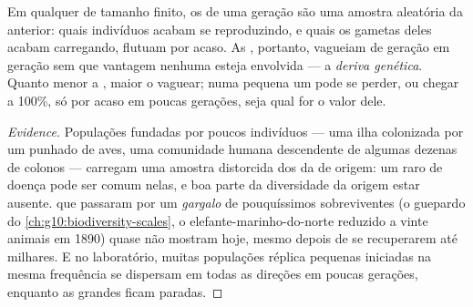 \begin{proposition}\label{prop:g12:selection-drift-speciation:drift}
Em qualquer  de tamanho finito, os  de uma geração são
uma amostra aleatória da anterior: quais indivíduos acabam se
reproduzindo, e quais  os gametas deles acabam carregando,
flutuam por acaso. As , portanto, vagueiam de
geração em geração sem que vantagem nenhuma esteja envolvida --- a
\emph{deriva genética}. Quanto menor a
, maior o vaguear; numa  pequena um  pode se
perder, ou chegar a 100\%, só por acaso em poucas gerações, seja qual
for o valor dele.
\end{proposition}
\begin{proof}[Evidence]
Populações fundadas por poucos indivíduos --- uma ilha colonizada por
um punhado de aves, uma comunidade humana descendente de algumas dezenas
de colonos --- carregam uma amostra distorcida dos  da 
de origem: um  raro de doença pode ser comum nelas, e boa parte da
diversidade da origem estar ausente.  que passaram por um
\emph{gargalo} de pouquíssimos sobreviventes (o guepardo do
\cref{ch:g10:biodiversity-scales}, o elefante-marinho-do-norte reduzido
a vinte animais em 1890) quase não mostram  hoje,
mesmo depois de se recuperarem até milhares. E no laboratório, muitas
populações réplica pequenas iniciadas na mesma frequência se dispersam
em todas as direções em poucas gerações, enquanto as grandes ficam paradas.
\end{proof}

